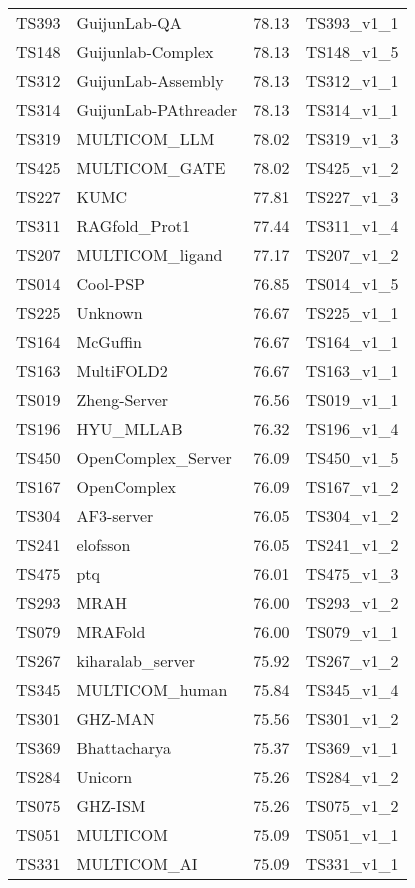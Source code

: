 \begin{longtable}{llll}
TS393 & GuijunLab-QA & 78.13 & TS393\_v1\_1 \\ 
TS148 & Guijunlab-Complex & 78.13 & TS148\_v1\_5 \\ 
TS312 & GuijunLab-Assembly & 78.13 & TS312\_v1\_1 \\ 
TS314 & GuijunLab-PAthreader & 78.13 & TS314\_v1\_1 \\ 
TS319 & MULTICOM\_LLM & 78.02 & TS319\_v1\_3 \\ 
TS425 & MULTICOM\_GATE & 78.02 & TS425\_v1\_2 \\ 
TS227 & KUMC & 77.81 & TS227\_v1\_3 \\ 
TS311 & RAGfold\_Prot1 & 77.44 & TS311\_v1\_4 \\ 
TS207 & MULTICOM\_ligand & 77.17 & TS207\_v1\_2 \\ 
TS014 & Cool-PSP & 76.85 & TS014\_v1\_5 \\ 
TS225 & Unknown & 76.67 & TS225\_v1\_1 \\ 
TS164 & McGuffin & 76.67 & TS164\_v1\_1 \\ 
TS163 & MultiFOLD2 & 76.67 & TS163\_v1\_1 \\ 
TS019 & Zheng-Server & 76.56 & TS019\_v1\_1 \\ 
TS196 & HYU\_MLLAB & 76.32 & TS196\_v1\_4 \\ 
TS450 & OpenComplex\_Server & 76.09 & TS450\_v1\_5 \\ 
TS167 & OpenComplex & 76.09 & TS167\_v1\_2 \\ 
TS304 & AF3-server & 76.05 & TS304\_v1\_2 \\ 
TS241 & elofsson & 76.05 & TS241\_v1\_2 \\ 
TS475 & ptq & 76.01 & TS475\_v1\_3 \\ 
TS293 & MRAH & 76.00 & TS293\_v1\_2 \\ 
TS079 & MRAFold & 76.00 & TS079\_v1\_1 \\ 
TS267 & kiharalab\_server & 75.92 & TS267\_v1\_2 \\ 
TS345 & MULTICOM\_human & 75.84 & TS345\_v1\_4 \\ 
TS301 & GHZ-MAN & 75.56 & TS301\_v1\_2 \\ 
TS369 & Bhattacharya & 75.37 & TS369\_v1\_1 \\ 
TS284 & Unicorn & 75.26 & TS284\_v1\_2 \\ 
TS075 & GHZ-ISM & 75.26 & TS075\_v1\_2 \\ 
TS051 & MULTICOM & 75.09 & TS051\_v1\_1 \\ 
TS331 & MULTICOM\_AI & 75.09 & TS331\_v1\_1 \\ 

\end{longtable}
